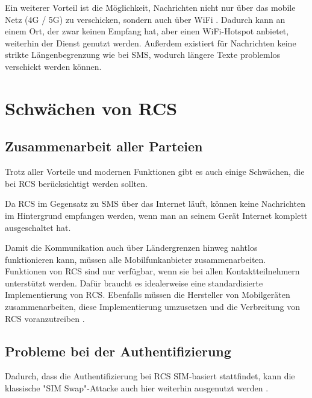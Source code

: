 \documentclass[conference]{IEEEtran}
\begin{document}
Ein weiterer Vorteil ist die Möglichkeit, Nachrichten nicht nur über das mobile Netz (4G / 5G) zu verschicken, sondern auch über WiFi \cite{5gmsg}.
Dadurch kann an einem Ort, der zwar keinen Empfang hat, aber einen WiFi-Hotspot anbietet, weiterhin der Dienst genutzt werden.
Außerdem existiert für Nachrichten keine strikte Längenbegrenzung wie bei SMS, wodurch längere Texte problemlos verschickt werden können.


\section{Schwächen von RCS}

\subsection{Zusammenarbeit aller Parteien}

Trotz aller Vorteile und modernen Funktionen gibt es auch einige Schwächen, die bei RCS berücksichtigt werden sollten.

Da RCS im Gegensatz zu SMS über das Internet läuft, können keine Nachrichten im Hintergrund empfangen werden, wenn man an seinem Gerät Internet komplett ausgeschaltet hat.

Damit die Kommunikation auch über Ländergrenzen hinweg nahtlos funktionieren kann, müssen alle Mobilfunkanbieter zusammenarbeiten.
Funktionen von RCS sind nur verfügbar, wenn sie bei allen Kontaktteilnehmern unterstützt werden.
Dafür braucht es idealerweise eine standardisierte Implementierung von RCS.
Ebenfalls müssen die Hersteller von Mobilgeräten zusammenarbeiten, diese Implementierung umzusetzen und die Verbreitung von RCS voranzutreiben \cite{rcsmno}.

\subsection{Probleme bei der Authentifizierung}

Dadurch, dass die Authentifizierung bei RCS SIM-basiert stattfindet, kann die klassische "SIM Swap"-Attacke auch hier weiterhin ausgenutzt werden \cite{sendoutsms}.
\end{document}
